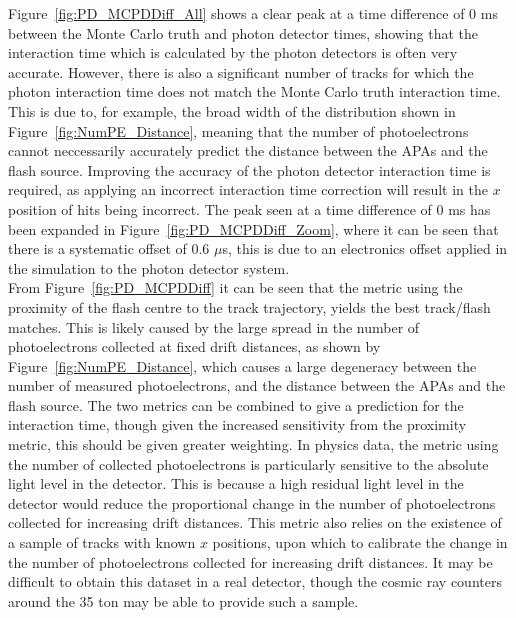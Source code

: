 Figure~\ref{fig:PD_MCPDDiff_All} shows a clear peak at a time difference of 0 ms between the Monte Carlo truth and photon detector times, showing that the interaction time which is calculated by the photon detectors is often very accurate. However, there is also a significant number of tracks for which the photon interaction time does not match the Monte Carlo truth interaction time. This is due to, for example, the broad width of the distribution shown in Figure~\ref{fig:NumPE_Distance}, meaning that the number of photoelectrons cannot neccessarily accurately predict the distance between the APAs and the flash source. Improving the accuracy of the photon detector interaction time is required, as applying an incorrect interaction time correction will result in the $x$ position of hits being incorrect. The peak seen at a time difference of 0 ms has been expanded in Figure~\ref{fig:PD_MCPDDiff_Zoom}, where it can be seen that there is a systematic offset of 0.6 $\mu$s, this is due to an electronics offset applied in the simulation to the photon detector system. \\

From Figure~\ref{fig:PD_MCPDDiff} it can be seen that the metric using the proximity of the flash centre to the track trajectory, yields the best track/flash matches. This is likely caused by the large spread in the number of photoelectrons collected at fixed drift distances, as shown by Figure~\ref{fig:NumPE_Distance}, which causes a large degeneracy between the number of measured photoelectrons, and the distance between the APAs and the flash source. The two metrics can be combined to give a prediction for the interaction time, though given the increased sensitivity from the proximity metric, this should be given greater weighting. In physics data, the metric using the number of collected photoelectrons is particularly sensitive to the absolute light level in the detector. This is because a high residual light level in the detector would reduce the proportional change in the number of photoelectrons collected for increasing drift distances. This metric also relies on the existence of a sample of tracks with known $x$ positions, upon which to calibrate the change in the number of photoelectrons collected for increasing drift distances. It may be difficult to obtain this dataset in a real detector, though the cosmic ray counters around the 35 ton may be able to provide such a sample. \\

